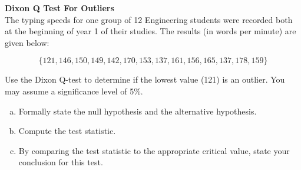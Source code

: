 
\item \textbf{Dixon Q Test For Outliers}
\\ 
The typing speeds for one group of 12 Engineering students were recorded both at the beginning 
of year 1 of their studies. 
The results (in words per minute) are given below: 

\[\{121, 146, 150, 149, 142, 170, 153, 137, 161, 156, 165,  137, 178, 159\} \]

Use the Dixon Q-test to determine if the lowest value (121) is an outlier. 
You may assume a significance level of 5\%. 
\begin{enumerate}[(a)]
\item Formally state the null hypothesis and the alternative hypothesis. \item Compute the test statistic. 
\item By comparing the test statistic to the appropriate critical value, state your conclusion for this test. 

\end{enumerate}

